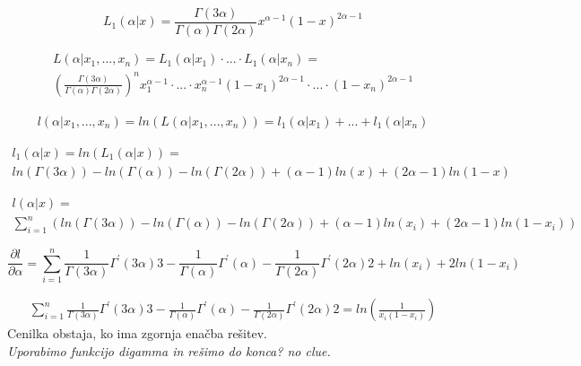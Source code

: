 \documentclass{article}
\begin{document}
\begin{equation*}
L_1(\alpha|x) =  \frac{\Gamma(3\alpha)}{\Gamma(\alpha)\Gamma(2\alpha)} x^{\alpha-1}(1-x)^{2\alpha-1}
\end{equation*}

\begin{equation*}
\begin{split}
L(\alpha|x_1,...,x_n) =  L_1(\alpha|x_1) \cdot ... \cdot L_1(\alpha|x_n) =             \\ 
 \left( \frac{\Gamma(3\alpha)}{\Gamma(\alpha)\Gamma(2\alpha)} \right)^n x_1^{\alpha-1} \cdot ... \cdot x_n^{\alpha-1} (1-x_1)^{2\alpha-1} \cdot ... \cdot (1-x_n)^{2\alpha-1}
\end{split}
\end{equation*}

\begin{equation*}
\begin{split}
l(\alpha|x_1,...,x_n) = ln( L(\alpha|x_1,...,x_n)) = 
l_1(\alpha|x_1) + ... + l_1(\alpha|x_n)
\end{split}
\end{equation*}

\begin{equation*}
\begin{split}
l_1(\alpha|x) = ln(L_1(\alpha|x)) =\\ ln(\Gamma(3\alpha)) - ln(\Gamma(\alpha)) - ln(\Gamma(2\alpha)) + (\alpha-1)ln(x) + (2\alpha-1)ln(1-x)
\end{split}
\end{equation*}

\begin{equation*}
\begin{split}
l(\alpha|x) =\\ \sum_{i=1}^n\left( ln(\Gamma(3\alpha)) - ln(\Gamma(\alpha)) - ln(\Gamma(2\alpha)) + (\alpha-1)ln(x_i) + (2\alpha-1)ln(1-x_i) \right)
\end{split}
\end{equation*}

\begin{equation*}
\frac{\partial l}{\partial \alpha} = \sum_{i = 1}^n \frac{1}{\Gamma(3\alpha)} \Gamma^{'}(3\alpha) 3 -
\frac{1}{\Gamma(\alpha)} \Gamma^{'}(\alpha) - \frac{1}{\Gamma(2\alpha)} \Gamma^{'}(2\alpha) 2 +
ln(x_i) + 2ln(1-x_i)
\end{equation*}

\begin{equation*}
\begin{split}
\sum_{i = 1}^n \frac{1}{\Gamma(3\alpha)} \Gamma^{'}(3\alpha) 3 -
\frac{1}{\Gamma(\alpha)} \Gamma^{'}(\alpha) - \frac{1}{\Gamma(2\alpha)} \Gamma^{'}(2\alpha) 2 =
ln(\frac{1}{x_i(1-x_i)})
\end{split}
\end{equation*}
Cenilka obstaja, ko ima zgornja enačba rešitev.\\
\textit{Uporabimo funkcijo digamma in rešimo do konca? no clue.}
\end{document}
